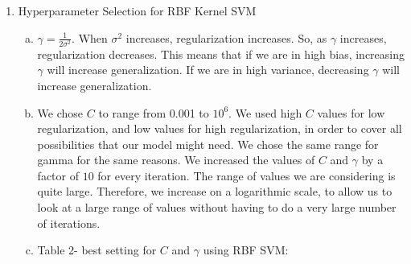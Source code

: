 \documentclass[11pt]{article}
\begin{document}
\begin{enumerate}
\begin{enumerate}
\end{enumerate}
\item Hyperparameter Selection for RBF Kernel SVM
\begin{enumerate}[(a)]
\item $\gamma = \frac{1}{2\sigma^2}$. When $\sigma^2$ increases, regularization increases. So, as $\gamma$
increases, regularization decreases. This means that if we are in high bias, increasing $\gamma$ will 
increase generalization. If we are in high variance, decreasing $\gamma$ will increase generalization. 
\item We chose $C$ to range from 0.001 to $10^6$. We used high $C$ values for low regularization, and 
low values for high regularization, in order to cover all possibilities that our model might need. We chose
the same range for gamma for the same reasons. We increased the values of $C$ and $\gamma$ by a factor of $10$ for every iteration. The range of values we are considering is quite large. Therefore, we increase on a logarithmic scale, to allow us to look at a large range of values without having to do a very large number of iterations. 
\item Table 2- best setting for $C$ and $\gamma$ using RBF SVM: \\


\end{enumerate}
\end{enumerate}
\end{document}
